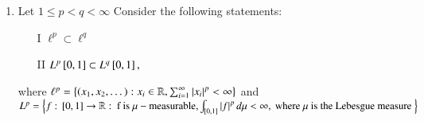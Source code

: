 \documentclass[journal]{IEEEtran}
\begin{document}
\begin{enumerate} [start=40]
\begin{multicols}{2}
\begin{enumerate}
        \item  Neither I or II 
    \end{enumerate}
\end{multicols}   
\bigskip
\item Let $1 \leq p < q < \infty$  Consider the following statements:
\begin{itemize}
    \item [I] $\ell^{p} \subset \ell^{q}$
    \item [II] $L^{p}{}\left[0,1\right] \subset L^{q}{}\left[0,1\right],$
\end{itemize}
where $\ell^{p} = \left\{\left(x_{1}, x_{2}, \dots\right) : x_{i} \in \mathbb{R}, \sum_{i=1}^{\infty} \left\vert x_i\right\vert^{p} < \infty\right\}$ and\\
{\small $L^{p}=\left\{f:{}\left[0,1\right]\to\mathbb{R}:\text{ f is }\mu-\text{measurable},\int_{{}\left[0,1\right]}\left\vert f\right\vert^{p}d\mu<\infty, \text{ where } \mu \text{ is the Lebesgue measure }\right\}$}\\




\end{enumerate}
\end{document}
